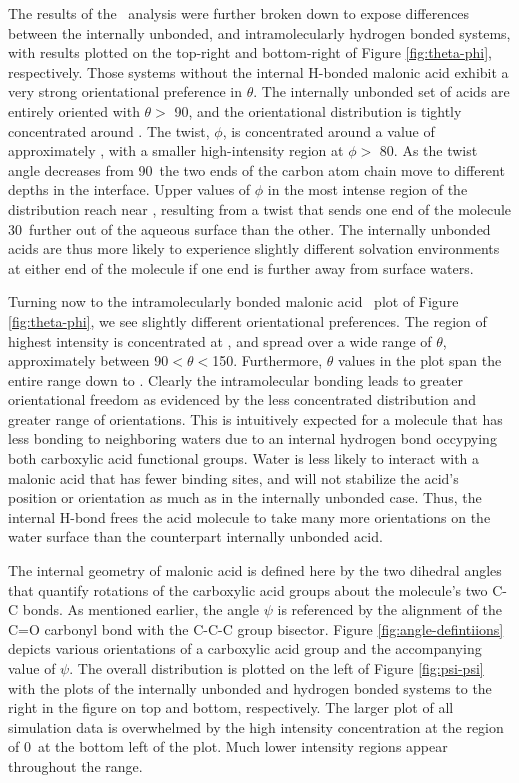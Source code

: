 The results of the \thetaphi~analysis were further broken down to expose differences between the internally unbonded, and intramolecularly hydrogen bonded systems, with results plotted on the top-right and bottom-right of Figure \ref{fig:theta-phi}, respectively. Those systems without the internal H-bonded malonic acid exhibit a very strong orientational preference in $\theta$. The internally unbonded set of acids are entirely oriented with $\theta >$ 90\degr, and the orientational distribution is tightly concentrated around \degr. The twist, $\phi$, is concentrated around a value of approximately \degr, with a smaller high-intensity region at $\phi >$ 80\degr. As the twist angle decreases from 90\degr~the two ends of the carbon atom chain move to different depths in the interface. Upper values of $\phi$ in the most intense region of the distribution reach near \degr, resulting from a twist that sends one end of the molecule 30\degr~further out of the aqueous surface than the other. The internally unbonded acids are thus more likely to experience slightly different solvation environments at either end of the molecule if one end is further away from surface waters.

Turning now to the intramolecularly bonded malonic acid \thetaphi~plot of Figure \ref{fig:theta-phi}, we see slightly different orientational preferences. The region of highest intensity is concentrated at \degr, and spread over a wide range of $\theta$, approximately between 90\degr $< \theta <$150\degr. Furthermore, $\theta$ values in the plot span the entire range down to \degr. Clearly the intramolecular bonding leads to greater orientational freedom as evidenced by the less concentrated distribution and greater range of orientations. This is intuitively expected for a molecule that has less bonding to neighboring waters due to an internal hydrogen bond occypying both carboxylic acid functional groups. Water is less likely to interact with a malonic acid that has fewer binding sites, and will not stabilize the acid's position or orientation as much as in the internally unbonded case. Thus, the internal H-bond frees the acid molecule to take many more orientations on the water surface than the counterpart internally unbonded acid.

The internal geometry of malonic acid is defined here by the two dihedral angles that quantify rotations of the carboxylic acid groups about the molecule's two C-C bonds. As mentioned earlier, the angle $\psi$ is referenced by the alignment of the C=O carbonyl bond with the C-C-C group bisector. Figure \ref{fig:angle-defintiions} depicts various orientations of a carboxylic acid group and the accompanying value of $\psi$. The overall \psipsi distribution is plotted on the left of Figure \ref{fig:psi-psi} with the plots of the internally unbonded and hydrogen bonded systems to the right in the figure on top and bottom, respectively. The larger plot of all simulation data is overwhelmed by the high intensity concentration at the \psipsi region of 0\degr~at the bottom left of the plot. Much lower intensity regions appear throughout the \psipsi range.

